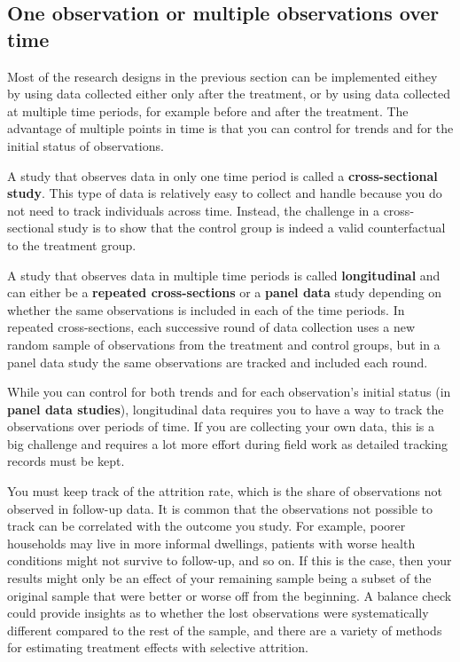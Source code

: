 \subsection{One observation or multiple observations over time}

Most of the research designs in the previous section can be implemented
eithey by using data collected either only after the treatment,
or by using data collected at multiple time periods,
for example before and after the treatment.
The advantage of multiple points in time is
that you can control for trends and for the initial status of observations.

A study that observes data in only one time period is called
a \textbf{cross-sectional study}.
This type of data is relatively easy to collect and handle because
you do not need to track individuals across time.
Instead, the challenge in a cross-sectional study is to
show that the control group is indeed a valid counterfactual to the treatment group.

A study that observes data in multiple time periods is called \textbf{longitudinal} and
can either be a \textbf{repeated cross-sections} or a \textbf{panel data} study
  
depending on whether the same observations is included in each of the time periods.
In repeated cross-sections,
each successive round of data collection uses a new random sample
of observations from the treatment and control groups,
but in a panel data study the same observations are tracked and included each round.

While you can control for both trends
and for each observation's initial status (in \textbf{panel data studies}),
longitudinal data requires you
to have a way to track the observations over periods of time.
If you are collecting your own data, this is a big challenge
and requires a lot more effort during field work
as detailed tracking records must be kept.

You must keep track of the attrition rate,
which is the share of observations not observed in follow-up data.
It is common that the observations not possible to track
can be correlated with the outcome you study.
For example, poorer households may live in more informal dwellings,
patients with worse health conditions might not survive to follow-up,
and so on.
If this is the case, then your results might only be an effect of your remaining sample
being a subset of the original sample that were better or worse off from the beginning.
A balance check could provide insights
as to whether the lost observations were systematically different
compared to the rest of the sample,
and there are a variety of methods for estimating treatment effects
with selective attrition.


